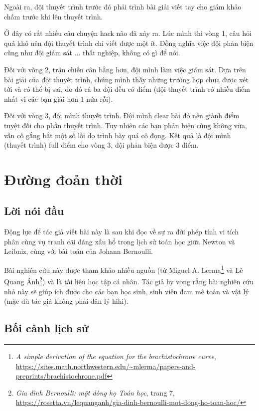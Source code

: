 \documentclass{mynotes}
\theoremstyle{definition}
\begin{document}
Ngoài ra, đội thuyết trình trước đó phải trình bài giải viết tay cho giám khảo chấm trước khi lên thuyết trình.

Ở đây có rất nhiều câu chuyện hack não đã xảy ra. Lúc mình thi vòng 1, câu hỏi quá khó nên đội thuyết trình chỉ viết được một ít. Đồng nghĩa việc đội phản biện cũng như đội giám sát ... thất nghiệp, không có gì để nói.

Đối với vòng 2, trận chiến cân bằng hơn, đội mình làm việc giám sát. Dựa trên bài giải của đội thuyết trình, chúng mình thấy những trường hợp chưa được xét tới và có thể bị sai, do đó cả ba đội đều có điểm (đội thuyết trình có nhiều điểm nhất vì các bạn giải hơn 1 nửa rồi).

Đối với vòng 3, đội mình thuyết trình. Đội mình clear bài đó nên giành điểm tuyệt đối cho phần thuyết trình. Tuy nhiên các bạn phản biện cũng không vừa, vẫn cố gắng bắt một số lỗi do trình bày quá cô đọng. Kết quả là đội mình (thuyết trình) full điểm cho vòng 3, đội phản biện được 3 điểm.



\chapter{Đường đoản thời}

\section*{Lời nói đầu}

Động lực để tác giả viết bài này là sau khi đọc về sự ra đời phép tính vi tích phân cùng vụ tranh cãi đáng xấu hổ trong lịch sử toán học giữa Newton và Leibniz, cùng với bài toán của Johann Bernoulli. 
        
Bài nghiên cứu này được tham khảo nhiều nguồn (từ Miguel A. Lerma\footnote{\emph{A simple derivation of the equation for the brachistochrone curve}, \url{https://sites.math.northwestern.edu/~mlerma/papers-and-preprints/brachistochrone.pdf}} và Lê Quang Ánh\footnote{\emph{Gia đình Bernoulli: một dòng họ Toán học}, trang 7, \url{https://rosetta.vn/lequanganh/gia-dinh-bernoulli-mot-dong-ho-toan-hoc/}}) và là tài liệu học tập cá nhân. Tác giả hy vọng rằng bài nghiên cứu nhỏ này sẽ giúp ích được cho các bạn học sinh, sinh viên đam mê toán và vật lý (mặc dù tác giả không phải dân lý hihi).

\section*{Bối cảnh lịch sử}
\end{document}
